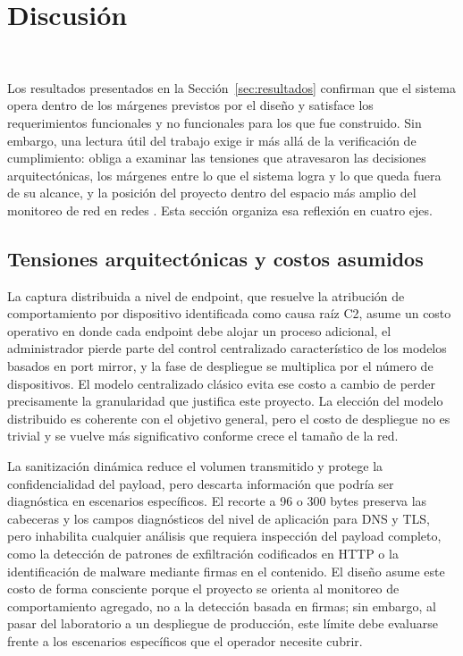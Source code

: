 \section{Discusión}
~\label{sec:discusion}

Los resultados presentados en la Sección~\ref{sec:resultados} 
confirman que el sistema opera dentro de los márgenes previstos 
por el diseño y satisface los requerimientos funcionales y no 
funcionales para los que fue construido. Sin embargo, una lectura 
útil del trabajo exige ir más allá de la verificación de 
cumplimiento: obliga a examinar las tensiones que atravesaron las 
decisiones arquitectónicas, los márgenes entre lo que el sistema 
logra y lo que queda fuera de su alcance, y la posición del 
proyecto dentro del espacio más amplio del monitoreo de red en 
redes \@. Esta sección organiza esa reflexión en cuatro ejes.

\subsection{Tensiones arquitectónicas y costos asumidos} 

La captura distribuida a nivel de endpoint, que resuelve la 
atribución de comportamiento por dispositivo identificada como 
causa raíz C2, asume un costo operativo en donde cada endpoint debe alojar 
un proceso adicional, el administrador pierde parte del control 
centralizado característico de los modelos basados en port mirror, 
y la fase de despliegue se multiplica por el número de 
dispositivos. El modelo centralizado clásico evita ese costo a 
cambio de perder precisamente la granularidad que justifica este 
proyecto. La elección del modelo distribuido es coherente con el 
objetivo general, pero el costo de despliegue no es trivial y se 
vuelve más significativo conforme crece el tamaño de la red.

La sanitización dinámica reduce el volumen transmitido y protege 
la confidencialidad del payload, pero descarta información que 
podría ser diagnóstica en escenarios específicos. El recorte a 
96 o 300 bytes preserva las cabeceras y los campos diagnósticos 
del nivel de aplicación para DNS y TLS, pero inhabilita cualquier 
análisis que requiera inspección del payload completo, como la 
detección de patrones de exfiltración codificados en HTTP o la 
identificación de malware mediante firmas en el contenido. El 
diseño asume este costo de forma consciente porque el proyecto se 
orienta al monitoreo de comportamiento agregado, no a la 
detección basada en firmas; sin embargo, al pasar del laboratorio 
a un despliegue de producción, este límite debe evaluarse frente 
a los escenarios específicos que el operador necesite cubrir.

